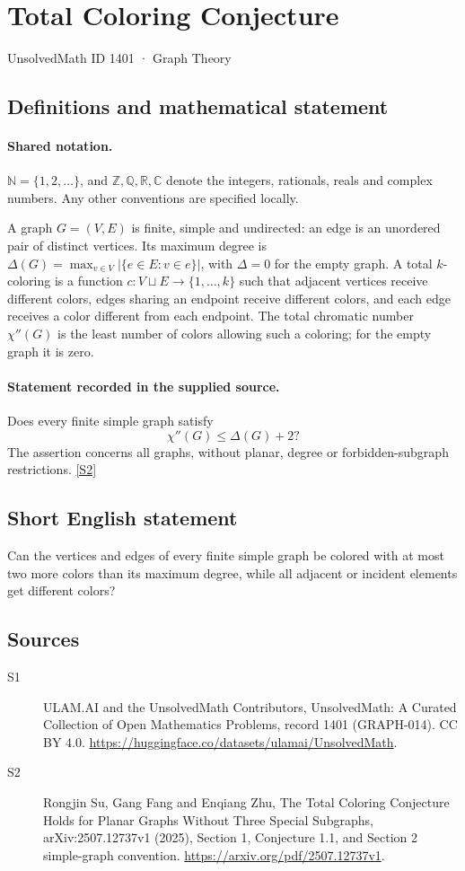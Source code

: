 \documentclass[11pt]{article}
\newcommand{\sref}[2]{\hyperlink{source:#1:#2}{[S#2]}}
\begin{document}
\setcounter{section}{1400}
\section{Total Coloring Conjecture}\label{1401}
{\small\sffamily UnsolvedMath ID 1401 · Graph Theory}
\subsection{Definitions and mathematical statement}

\paragraph{Shared notation.}$\mathbb N=\{1,2,\ldots\}$, and $\mathbb Z,\mathbb Q,\mathbb R,\mathbb C$ denote the integers, rationals, reals and complex numbers. Any other conventions are specified locally.


A graph $G=(V,E)$ is finite, simple and undirected: an edge is an unordered pair of distinct vertices. Its maximum degree is $\Delta(G)=\max_{v\in V}|\{e\in E:v\in e\}|$, with $\Delta=0$ for the empty graph. A total $k$-coloring is a function $c:V\sqcup E\to\{1,\ldots,k\}$ such that adjacent vertices receive different colors, edges sharing an endpoint receive different colors, and each edge receives a color different from each endpoint. The total chromatic number $\chi''(G)$ is the least number of colors allowing such a coloring; for the empty graph it is zero.
\paragraph{Statement recorded in the supplied source.}
Does every finite simple graph satisfy
\[
 \chi''(G)\le \Delta(G)+2?
\]
The assertion concerns all graphs, without planar, degree or forbidden-subgraph restrictions. \sref{1401}{2}
\subsection{Short English statement}
Can the vertices and edges of every finite simple graph be colored with at most two more colors than its maximum degree, while all adjacent or incident elements get different colors?
\subsection{Sources}
\begin{description}
\item[\hypertarget{source:1401:1}{S1}] ULAM.AI and the UnsolvedMath Contributors, UnsolvedMath: A Curated Collection of Open Mathematics Problems, record 1401 (GRAPH-014). CC BY 4.0. \url{https://huggingface.co/datasets/ulamai/UnsolvedMath}.
\item[\hypertarget{source:1401:2}{S2}] Rongjin Su, Gang Fang and Enqiang Zhu, The Total Coloring Conjecture Holds for Planar Graphs Without Three Special Subgraphs, arXiv:2507.12737v1 (2025), Section 1, Conjecture 1.1, and Section 2 simple-graph convention. \url{https://arxiv.org/pdf/2507.12737v1}.
\end{description}
\label{end:1401}
\end{document}
